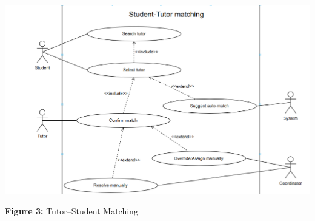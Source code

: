 

\begin{center}
\includegraphics[width=0.9\linewidth]{images/UC-02.png}
\end{center}

\begin{center}
\textbf{Figure 3:}  Tutor--Student Matching
\end{center}

